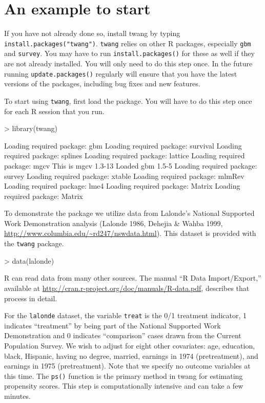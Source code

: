 \documentclass{article}
\begin{document}
\section{An example to start}


If you have not already done so, install twang by typing
\texttt{install.packages("twang")}. \texttt{twang} relies on other R packages,
especially \texttt{gbm} and \texttt{survey}. You may have to run
\texttt{install.packages()} for these as well if they are not already
installed. You will only need to do this step once. In the future running
\texttt{update.packages()} regularly will ensure that you have the latest
versions of the packages, including bug fixes and new features.

To start using \texttt{twang}, first load the package. You will have to do this
step once for each R session that you run.

\begin{Schunk}
\begin{Sinput}
> library(twang)
\end{Sinput}
\begin{Soutput}
Loading required package: gbm
Loading required package: survival
Loading required package: splines
Loading required package: lattice
Loading required package: mgcv
This is mgcv 1.3-13 
Loaded gbm 1.5-5 
Loading required package: survey
Loading required package: xtable
Loading required package: mlmRev
Loading required package: lme4
Loading required package: Matrix
Loading required package: Matrix
\end{Soutput}
\end{Schunk}

To demonstrate the package we utilize data from Lalonde's National Supported
Work Demonstration analysis (Lalonde 1986, Dehejia \& Wahba 1999,
\url{http://www.columbia.edu/~rd247/nswdata.html}). This dataset is provided
with the \texttt{twang} package.

\begin{Schunk}
\begin{Sinput}
> data(lalonde)
\end{Sinput}
\end{Schunk}

R can read data from many other sources. The manual ``R Data Import/Export,''
available at \url{http://cran.r-project.org/doc/manuals/R-data.pdf}, describes
that process in detail.

For the \texttt{lalonde} dataset, the variable \texttt{treat} is the 0/1
treatment indicator, 1 indicates ``treatment'' by being part of the National
Supported Work Demonstration and 0 indicates ``comparison'' cases drawn from
the Current Population Survey. We wish to adjust for eight other covariates:
age, education, black, Hispanic, having no degree, married, earnings in 1974
(pretreatment), and earnings in 1975 (pretreatment). Note that we specify no
outcome variables at this time. The \texttt{ps()} function is the primary
method in twang for estimating propensity scores. This step is computationally
intensive and can take a few minutes.
\end{document}
